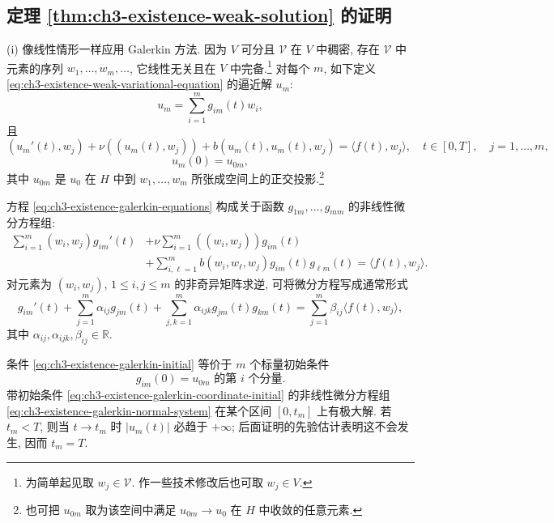 \subsection{定理 \ref{thm:ch3-existence-weak-solution} 的证明}
\label{subsec:ch3-existence-proof}
(i) 像线性情形一样应用 Galerkin 方法. 因为 $V$ 可分且 $\mathcal V$ 在 $V$ 中稠密, 存在 $\mathcal V$ 中元素的序列 $w_1,\ldots,w_m,\ldots$, 它线性无关且在 $V$ 中完备.\footnote{为简单起见取 $w_j\in\mathcal V$. 作一些技术修改后也可取 $w_j\in V$.} 对每个 $m$, 如下定义 \eqref{eq:ch3-existence-weak-variational-equation} 的逼近解 $u_m$:
\begin{equation}
u_m=\sum_{i=1}^{m}g_{im}(t)w_i,
\label{eq:ch3-existence-galerkin-expansion}
\end{equation}
且
\begin{equation}
(u_m'(t),w_j)+\nu((u_m(t),w_j))
+b(u_m(t),u_m(t),w_j)=\langle f(t),w_j\rangle,
\quad t\in[0,T],\quad j=1,\ldots,m,
\label{eq:ch3-existence-galerkin-equations}
\end{equation}
\begin{equation}
u_m(0)=u_{0m},
\label{eq:ch3-existence-galerkin-initial}
\end{equation}
其中 $u_{0m}$ 是 $u_0$ 在 $H$ 中到 $w_1,\ldots,w_m$ 所张成空间上的正交投影.\footnote{也可把 $u_{0m}$ 取为该空间中满足 $u_{0m}\to u_0$ 在 $H$ 中收敛的任意元素.}

方程 \eqref{eq:ch3-existence-galerkin-equations} 构成关于函数 $g_{1m},\ldots,g_{mm}$ 的非线性微分方程组:
\begin{equation}
\begin{aligned}
\sum_{i=1}^{m}(w_i,w_j)g_{im}'(t)
&+\nu\sum_{i=1}^{m}((w_i,w_j))g_{im}(t)\\
&+\sum_{i,\ell=1}^{m}b(w_i,w_\ell,w_j)g_{im}(t)g_{\ell m}(t)
=\langle f(t),w_j\rangle.
\end{aligned}
\label{eq:ch3-existence-galerkin-coordinate-system}
\end{equation}
对元素为 $(w_i,w_j)$, $1\leq i,j\leq m$ 的非奇异矩阵求逆, 可将微分方程写成通常形式
\begin{equation}
g_{im}'(t)+\sum_{j=1}^{m}\alpha_{ij}g_{jm}(t)
+\sum_{j,k=1}^{m}\alpha_{ijk}g_{jm}(t)g_{km}(t)
=\sum_{j=1}^{m}\beta_{ij}\langle f(t),w_j\rangle,
\label{eq:ch3-existence-galerkin-normal-system}
\end{equation}
其中 $\alpha_{ij},\alpha_{ijk},\beta_{ij}\in\mathbb R$.

条件 \eqref{eq:ch3-existence-galerkin-initial} 等价于 $m$ 个标量初始条件
\begin{equation}
g_{im}(0)=u_{0m}\text{ 的第 }i\text{ 个分量}.
\label{eq:ch3-existence-galerkin-coordinate-initial}
\end{equation}
带初始条件 \eqref{eq:ch3-existence-galerkin-coordinate-initial} 的非线性微分方程组 \eqref{eq:ch3-existence-galerkin-normal-system} 在某个区间 $[0,t_m]$ 上有极大解. 若 $t_m<T$, 则当 $t\to t_m$ 时 $|u_m(t)|$ 必趋于 $+\infty$; 后面证明的先验估计表明这不会发生, 因而 $t_m=T$.

